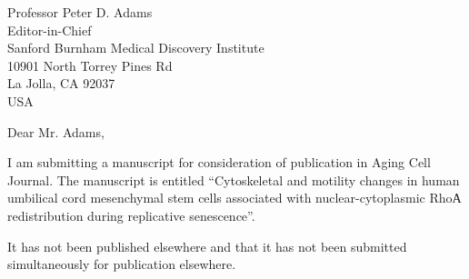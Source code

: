 \documentclass[11pt]{letter} %
\begin{document}

\begin{letter}{
Professor Peter D. Adams \\
Editor-in-Chief \\
Sanford Burnham Medical Discovery Institute \\
10901 North Torrey Pines Rd \\
La Jolla, CA 92037 \\
USA}

\iffalse
\begin{center}
\large\bf Dr. Danila Bobkov \\ %
4 Tikhoretsky\\ St-Petersburg, Russia 195251 \\ (999) 043-5439 %
\end{center}
\vfill
\fi
\signature{Dr. Danila Bobkov \\
Institute of Cytology RAS \\
Tikhoretsky ave. 4,  194064 \\
St-Petersburg, Russia \\
Tel. :+7(999)043-5439 \\
E-mail: bobkov@incras.ru} %


\opening{Dear Mr. Adams,}

I am submitting a manuscript for consideration of publication in Aging Cell Journal.
The manuscript is entitled “Cytoskeletal and motility changes in human umbilical cord mesenchymal stem cells associated with nuclear-cytoplasmic RhoА redistribution during replicative senescence”.

It has not been published elsewhere and that it has not been submitted simultaneously for publication elsewhere.


\end{letter}
\end{document}

